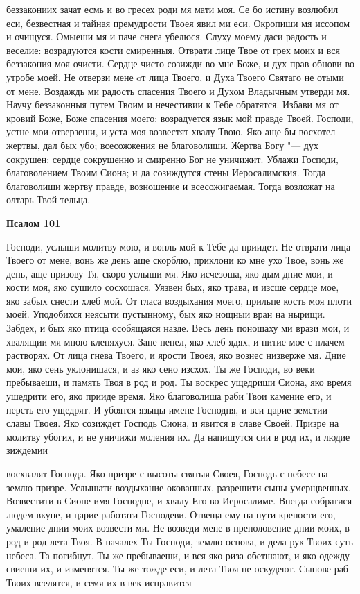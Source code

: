 беззакониих зачат есмь и во гресех роди мя мати моя. Се бо истину возлюбил
еси, безвестная и тайная премудрости Твоея явил ми еси. Окропиши мя
иссопом и очищуся. Омыеши мя и паче снега убелюся. Слуху моему даси
радость и веселие: возрадуются кости смиренныя. Отврати лице Твое от
грех моих и вся беззакония моя очисти. Сердце чисто созижди во
мне Боже, и дух прав обнови во утробе моей. Не отверзи мене oт
лица Твоего, и Духа Твоего Святаго не отыми от мене. Воздаждь ми
радость спасения Твоего и Духом Владычным утверди мя. Научу
беззаконныя путем Твоим и нечестивии к Тебе обратятся. Избави мя от
кровий Боже, Боже спасения моего; возрадуется язык мой правде
Твоей. Господи, устне мои отверзеши, и уста моя возвестят хвалу
Твою. Яко аще бы восхотел жертвы, дал бых убо; всесожжения не
благоволиши. Жертва Богу "--- дух сокрушен: сердце сокрушенно и смиренно
Бог не уничижит. Ублажи Господи, благоволением Твоим Сиона; и
да созиждутся стены Иеросалимския. Тогда благоволиши жертву
правде, возношение и всесожигаемая. Тогда возложат на олтарь Твой
тельца.






 

\bfseries Псалом 101\normalfont{}


   Господи, услыши молитву мою, и вопль мой к Тебе да приидет. Не
отврати лица Твоего от мене, вонь же день аще скорблю, приклони ко мне
ухо Твое, вонь же день, аще призову Тя, скоро услыши мя. Яко исчезоша,
яко дым дние мои, и кости моя, яко сушило сосхошася. Уязвен бых,
яко трава, и изсше сердце мое, яко забых снести хлеб мой. От гласа
воздыхания моего, прильпе кость моя плоти моей. Уподобихся неясыти
пустынному, бых яко нощныи вран на нырищи. Забдех, и бых яко птица
особящаяся назде. Весь день поношаху ми врази мои, и хвалящии мя
мною кленяхуся. Зане пепел, яко хлеб ядях, и питие мое с плачем
растворях. От лица гнева Твоего, и ярости Твоея, яко вознес низверже
мя. Дние мои, яко сень уклонишася, и аз яко сено изсхох. Ты же
Господи, во веки пребываеши, и память Твоя в род и род. Ты воскрес
ущедриши Сиона, яко время ушедрити его, яко прииде время. Яко
благоволиша раби Твои камение его, и персть его ущедрят. И убоятся языцы
имене Господня, и вси царие земстии славы Твоея. Яко созиждет
Господь Сиона, и явится в славе Своей. Призре на молитву убогих, и не
уничижи моления их. Да напишутся сии в род их, и людие зиждемии

восхвалят Господа. Яко призре с высоты святыя Своея, Господь с
небесе на землю призре. Услышати воздыхание окованных, разрешити
сыны умерщвенных. Возвестити в Сионе имя Господне, и хвалу Его
во Иеросалиме. Внегда собратися людем вкупе, и царие работати
Господеви. Отвеща ему на пути крепости его, умаление днии моих
возвести ми. Не возведи мене в преполовение днии моих, в род и
род лета Твоя. В началех Ты Господи, землю основа, и дела рук
Твоих суть небеса. Та погибнут, Ты же пребываеши, и вся яко риза
обетшают, и яко одежду свиеши их, и изменятся. Ты же тожде еси, и
лета Твоя не оскудеют. Сынове раб Твоих вселятся, и семя их в век
исправится


